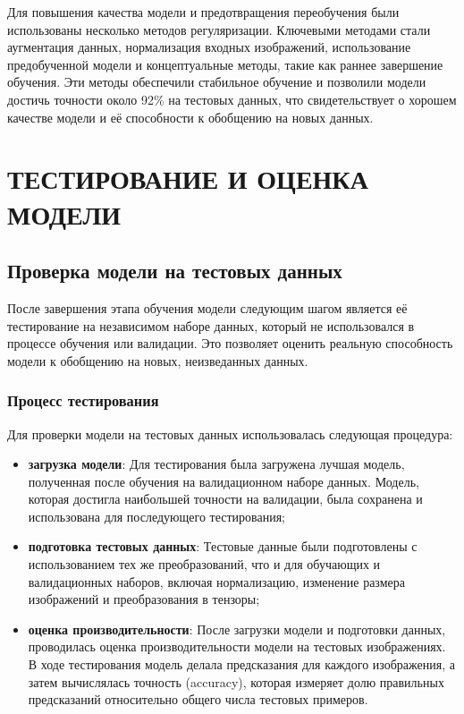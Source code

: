 {    Для повышения качества модели и предотвращения переобучения были использованы несколько методов регуляризации. Ключевыми методами стали аугментация данных, нормализация входных изображений, использование предобученной модели и концептуальные методы, такие как раннее завершение обучения. Эти методы обеспечили стабильное обучение и позволили модели достичь точности около 92\% на тестовых данных, что свидетельствует о хорошем качестве модели и её способности к обобщению на новых данных.


\newpage
\section{ТЕСТИРОВАНИЕ И ОЦЕНКА МОДЕЛИ}

    \subsection{Проверка модели на тестовых данных}

    После завершения этапа обучения модели следующим шагом является её тестирование на независимом наборе данных, который не использовался в процессе обучения или валидации. Это позволяет оценить реальную способность модели к обобщению на новых, неизведанных данных.

    \subsubsection*{Процесс тестирования}

    Для проверки модели на тестовых данных использовалась следующая процедура:

    \begin{itemize}
        \item \textbf{загрузка модели}: Для тестирования была загружена лучшая модель, полученная после обучения на валидационном наборе данных. Модель, которая достигла наибольшей точности на валидации, была сохранена и использована для последующего тестирования;
        \item \textbf{подготовка тестовых данных}: Тестовые данные были подготовлены с использованием тех же преобразований, что и для обучающих и валидационных наборов, включая нормализацию, изменение размера изображений и преобразования в тензоры;
        \item \textbf{оценка производительности}: После загрузки модели и подготовки данных, проводилась оценка производительности модели на тестовых изображениях. В ходе тестирования модель делала предсказания для каждого изображения, а затем вычислялась точность (accuracy), которая измеряет долю правильных предсказаний относительно общего числа тестовых примеров.
    \end{itemize}

}
